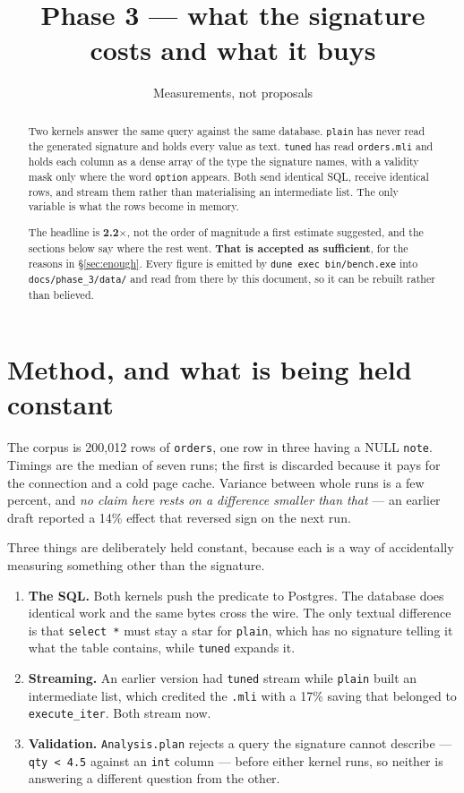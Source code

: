 \documentclass[11pt,a4paper]{article}
\title{Phase 3 --- what the signature costs and what it buys}
\author{Measurements, not proposals}
\date{}
\begin{document}
\maketitle

\begin{abstract}
\noindent
Two kernels answer the same query against the same database. \texttt{plain} has never
read the generated signature and holds every value as text. \texttt{tuned} has read
\texttt{orders.mli} and holds each column as a dense array of the type the signature
names, with a validity mask only where the word \texttt{option} appears. Both send
identical SQL, receive identical rows, and stream them rather than materialising an
intermediate list. The only variable is what the rows become in memory.

The headline is \textbf{2.2$\times$}, not the order of magnitude a first estimate
suggested, and the sections below say where the rest went. \textbf{That is accepted as
sufficient}, for the reasons in \S\ref{sec:enough}. Every figure is emitted by
\texttt{dune exec bin/bench.exe} into \texttt{docs/phase\_3/data/} and read from there
by this document, so it can be rebuilt rather than believed.
\end{abstract}

\section{Method, and what is being held constant}

The corpus is 200{,}012 rows of \texttt{orders}, one row in three having a NULL
\texttt{note}. Timings are the median of seven runs; the first is discarded because it
pays for the connection and a cold page cache. Variance between whole runs is a few
percent, and \emph{no claim here rests on a difference smaller than that} --- an
earlier draft reported a 14\% effect that reversed sign on the next run.

Three things are deliberately held constant, because each is a way of accidentally
measuring something other than the signature.

\begin{enumerate}[leftmargin=1.4em]
\item \textbf{The SQL.} Both kernels push the predicate to Postgres. The database does
  identical work and the same bytes cross the wire. The only textual difference is that
  \texttt{select *} must stay a star for \texttt{plain}, which has no signature telling
  it what the table contains, while \texttt{tuned} expands it.
\item \textbf{Streaming.} An earlier version had \texttt{tuned} stream while
  \texttt{plain} built an intermediate list, which credited the \texttt{.mli} with a
  17\% saving that belonged to \texttt{execute\_iter}. Both stream now.
\item \textbf{Validation.} \texttt{Analysis.plan} rejects a query the signature cannot
  describe --- \texttt{qty < 4.5} against an \texttt{int} column --- before either
  kernel runs, so neither is answering a different question from the other.
\end{enumerate}
\end{document}
